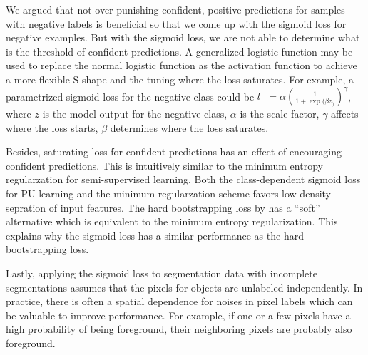 We argued that not over-punishing confident, positive predictions for samples with negative labels is beneficial so that we come up with the sigmoid loss for negative examples.
But with the sigmoid loss, we are not able to determine what is the threshold of confident predictions.
A generalized logistic function may be used to replace the normal logistic function as the activation function to achieve a more flexible S-shape and the tuning where the loss saturates.
For example, a parametrized sigmoid loss for the negative class could be $l_{-} = \alpha (\frac{1}{1+\exp{(\beta z_)}})^{\gamma}$, where $z$ is the model output for the negative class, $\alpha$ is the scale factor, $\gamma$ affects where the loss starts, $\beta$ determines where the loss saturates.


Besides, saturating loss for confident predictions has an effect of encouraging confident predictions.
This is intuitively similar to the minimum entropy regularzation for semi-supervised learning.
Both the class-dependent sigmoid loss for PU learning and the minimum regularzation scheme favors low density sepration of input features.
The hard bootstrapping loss by \cite{reed2014training} has a ``soft'' alternative which is equivalent to the minimum entropy regularization.
This explains why the sigmoid loss has a similar performance as the hard bootstrapping loss.

Lastly, applying the sigmoid loss to segmentation data with incomplete segmentations assumes that the pixels for objects are unlabeled independently.
In practice, there is often a spatial dependence for noises in pixel labels which can be valuable to improve performance.
For example, if one or a few pixels have a high probability of being foreground, their neighboring pixels are probably also foreground.


